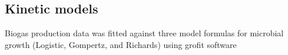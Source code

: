 \subsection{Kinetic models}
Biogas production data was fitted against three model formulas for microbial growth (Logistic, Gompertz, and Richards) using grofit software 